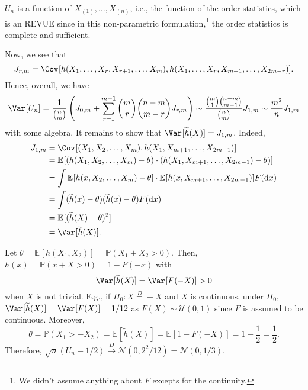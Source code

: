 \begin{remark}
	\(U_n\) is a function of \(X_{(1)}, \dots , X_{(n)}\), i.e., the function of the order statistics, which is an REVUE since in this non-parametric formulation,\footnote{We didn't assume anything about \(F\) excepts for the continuity.} the order statistics is complete and sufficient.
\end{remark}

Now, we see that
\[
	J_{r, m}
	= \Cov_{}[h(X_1, \dots , X_r, X_{r+1}, \dots , X_m), h(X_1, \dots , X_r, X_{m+1}, \dots , X_{2m-r})].
\]
Hence, overall, we have
\[
	\Var_{}[U_n]
	= \frac{1}{\binom{n}{m}} \left( J_{0, m} + \sum_{r=1}^{m-1} \binom{m}{r} \binom{n-m}{m-r} J_{r, m} \right)
	\sim \frac{\binom{m}{1} \binom{n-m}{m-1}}{\binom{n}{m}} J_{1, m}
	\sim \frac{m^2}{n} J_{1, m}
\]
with some algebra. It remains to show that \(\Var_{}[\widetilde{h} (X)] = J_{1, m}\). Indeed,
\[
	\begin{split}
		J_{1, m}
		 & = \Cov_{}[(X_1, X_2, \dots , X_m), h(X_1, X_{m+1}, \dots , X_{2m-1})]                                                       \\
		 & = \mathbb{E}_{}[(h(X_1, X_2, \dots , X_m) - \theta ) \cdot (h(X_1, X_{m+1}, \dots , X_{2m-1}) - \theta ) ]                  \\
		 & = \int \mathbb{E}_{}[h(x, X_2, \dots , X_m) - \theta ] \cdot \mathbb{E}_{}[h(x, X_{m+1}, \dots , X_{2m-1})] F(\mathrm{d} x) \\
		 & = \int (\widetilde{h} (x) - \theta ) (\widetilde{h} (x) - \theta ) F(\mathrm{d} x)                                          \\
		 & = \mathbb{E}_{}[(\widetilde{h} (X) - \theta )^2]                                                                            \\
		 & = \Var_{}[\widetilde{h} (X)] .
	\end{split}
\]

\begin{eg}
	Let \(\theta = \mathbb{E}_{}[h(X_1, X_2)] = \mathbb{P} (X_1 + X_2 > 0)\). Then, \(h(x) = \mathbb{P} (x + X > 0) = 1 - F(-x)\) with
	\[
		\Var_{}[\widetilde{h} (X)]
		= \Var_{}[F(-X)]
		> 0
	\]
	when \(X\) is not trivial. E.g., if \(H_0 \colon X \overset{D}{=} -X \) and \(X\) is continuous, under \(H_0\), \(\Var_{}[\widetilde{h} (X)] = \Var_{}[F(X)] = 1 / 12\) as \(F(X) \sim \mathcal{U} (0, 1)\) since \(F\) is assumed to be continuous. Moreover,
	\[
		\theta
		= \mathbb{P} (X_1 > -X_2)
		= \mathbb{E}_{}[\widetilde{h} (X)]
		= \mathbb{E}_{}[1 - F(-X)]
		= 1 - \frac{1}{2}
		= \frac{1}{2}.
	\]
	Therefore, \(\sqrt{n} ( U_n - 1 / 2 ) \overset{D}{\to} \mathcal{N} ( 0, 2^2 / 12 ) = \mathcal{N} ( 0, 1 / 3 ) \).
\end{eg}

